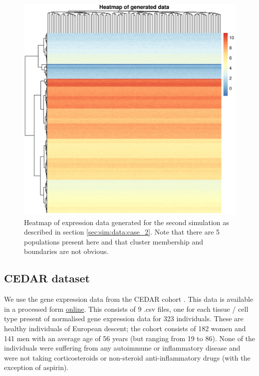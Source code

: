 \documentclass[12pt]{article} %
\begin{document}
	\begin{figure}[!htb]
		\centering
		\includegraphics[scale=0.65]{Images/Gen_data/Case_2/data_pheatmap_0.png}
		\caption{Heatmap of expression data generated for the second simulation as described in section \ref{sec:sim:data:case_2}. Note that there are 5 populations present here and that cluster membership and boundaries are not obvious.}
		\label{fig:gen_data_sim_case_2}
	\end{figure}

	
	\subsection{CEDAR dataset}
	We use the gene expression data from the CEDAR cohort \cite{TheInternationalIBDGeneticsConsortiumIBDriskloci2018}. This data is available in a processed form \href{http://139.165.108.18/srv/genmol/permanent/1be6993fe41c12a051c9244d67c91da2be49e5dd26a6cd79f442bc006971e2ef/crohn-index.html}{online}. This consists of 9 .csv files, one for each tissue / cell type present of normalised gene expression data for 323 individuals. These are healthy individuals of European descent; the cohort consists of 182 women and 141 men with an average age of 56 years (but ranging from 19 to 86). None of the individuals were suffering from any autoimmune or inflammatory disease and were not taking corticosteroids or non-steroid anti-inflammatory drugs (with the exception of aspirin). 
	
\end{document}

